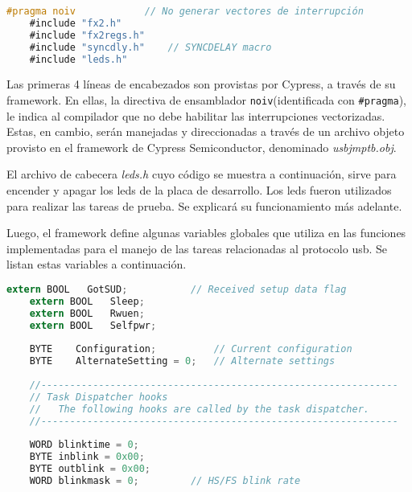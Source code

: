 	\begin{lstlisting}[language=C,backgroundcolor=\color{gray!30}]
	#pragma noiv			// No generar vectores de interrupción
	#include "fx2.h"
	#include "fx2regs.h"
	#include "syncdly.h"	// SYNCDELAY macro
	#include "leds.h"
	\end{lstlisting}
	
	Las primeras 4 líneas de encabezados son provistas por Cypress, a través de su framework. En ellas, la directiva de ensamblador \texttt{noiv}(identificada con \verb|#pragma|), le indica al compilador que no debe habilitar las interrupciones vectorizadas. Estas, en cambio, serán manejadas y direccionadas a través de un archivo objeto provisto en el framework de Cypress Semiconductor, denominado {\it usbjmptb.obj}.%
	
	El archivo de cabecera {\it leds.h} cuyo código se muestra a continuación, sirve para encender y apagar los \acrshort{led}s de la placa de desarrollo. Los \acrshort{led}s fueron utilizados para realizar las tareas de prueba. Se explicará su funcionamiento más adelante.%
	
	
	Luego, el framework define algunas variables globales que utiliza en las funciones implementadas para el manejo de las tareas relacionadas al protocolo \acrshort{usb}. Se listan estas variables a continuación.
	
	\begin{lstlisting}[language=C,backgroundcolor=\color{gray!30}]
	extern BOOL   GotSUD;			// Received setup data flag
	extern BOOL   Sleep;
	extern BOOL   Rwuen;
	extern BOOL   Selfpwr;
	
	BYTE    Configuration;      	// Current configuration
	BYTE    AlternateSetting = 0;   // Alternate settings
	
	//--------------------------------------------------------------
	// Task Dispatcher hooks
	//   The following hooks are called by the task dispatcher.
	//--------------------------------------------------------------
	
	WORD blinktime = 0;
	BYTE inblink = 0x00;
	BYTE outblink = 0x00;
	WORD blinkmask = 0;			// HS/FS blink rate
	\end{lstlisting}
	
